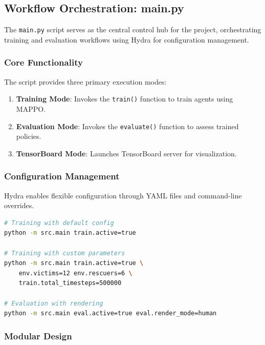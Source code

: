 \documentclass[11pt,a4paper]{article}
\begin{document}
\subsection{Workflow Orchestration: main.py}
\label{subsec:main}

The \texttt{main.py} script serves as the central control hub for the project, orchestrating training and evaluation workflows using Hydra for configuration management.

\subsubsection{Core Functionality}
\label{subsubsec:core_func}

The script provides three primary execution modes:

\begin{enumerate}
    \item \textbf{Training Mode}: Invokes the \texttt{train()} function to train agents using MAPPO.
    \item \textbf{Evaluation Mode}: Invokes the \texttt{evaluate()} function to assess trained policies.
    \item \textbf{TensorBoard Mode}: Launches TensorBoard server for visualization.
\end{enumerate}

\subsubsection{Configuration Management}
\label{subsubsec:config_mgmt}

Hydra enables flexible configuration through YAML files and command-line overrides.

\begin{lstlisting}[language=bash,caption={Example usage.},label={lst:usage}]
# Training with default config
python -m src.main train.active=true

# Training with custom parameters
python -m src.main train.active=true \
    env.victims=12 env.rescuers=6 \
    train.total_timesteps=500000

# Evaluation with rendering
python -m src.main eval.active=true eval.render_mode=human
\end{lstlisting}

\subsubsection{Modular Design}
\label{subsubsec:modular}
\end{document}
